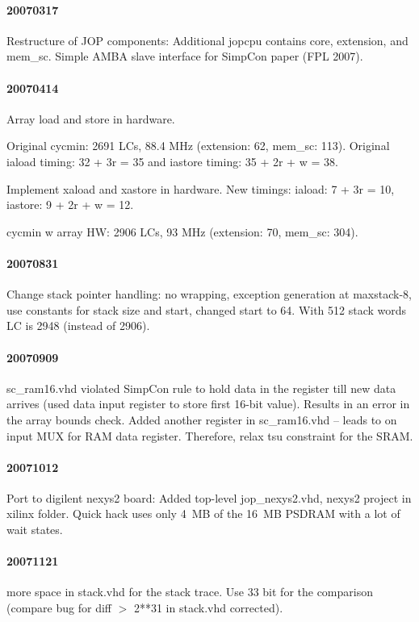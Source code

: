 \documentclass[a4paper,12pt]{scrartcl}
\newcommand{\code}[1]{{\textsf{#1}}}
\begin{document}
\paragraph{20070317}

Restructure of JOP components: Additional \code{jopcpu} contains
\code{core}, \code{extension}, and \code{mem\_sc}. Simple AMBA slave
interface for SimpCon paper (FPL 2007).

\paragraph{20070414} Array load and store in hardware.

Original cycmin: 2691 LCs, 88.4 MHz (extension: 62, mem\_sc: 113).
Original iaload timing: 32 + 3r = 35 and iastore timing: 35 + 2r + w
= 38.

Implement xaload and xastore in hardware. New timings: iaload: 7 + 3r
= 10, iastore: 9 + 2r + w = 12.

cycmin w array HW: 2906 LCs, 93 MHz (extension: 70, mem\_sc: 304).

\paragraph{20070831}

Change stack pointer handling: no wrapping, exception generation at
maxstack-8, use constants for stack size and start, changed start to
64. With 512 stack words LC is 2948 (instead of 2906).

\paragraph{20070909} sc\_ram16.vhd violated SimpCon rule to hold data in the
register till new data arrives (used data input register to store
first 16-bit value). Results in an error in the array bounds check.
Added another register in sc\_ram16.vhd -- leads to on input MUX for
RAM data register. Therefore, relax tsu constraint for the SRAM.

\paragraph{20071012} Port to digilent nexys2 board: Added top-level
jop\_nexys2.vhd, nexys2 project in xilinx folder. Quick hack uses
only 4~MB of the 16~MB PSDRAM with a lot of wait states.

\paragraph{20071121} more space in stack.vhd for the stack
trace. Use 33 bit for the comparison (compare bug for diff $>$ 2**31
in stack.vhd corrected).
\end{document}
